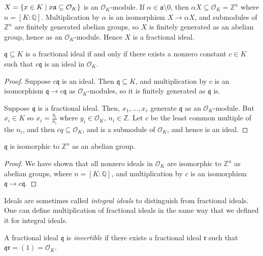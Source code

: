 \( X = \qty{x \in K \mid x\mathfrak a \subseteq \mathcal O_K} \) is an \( \mathcal O_K \)-module.
If \( \alpha \in \mathfrak a \setminus \qty{0} \), then \( \alpha X \subseteq \mathcal O_K = \mathbb Z^n \) where \( n = [K:\mathbb Q] \).
Multiplication by \( \alpha \) is an isomorphism \( X \to \alpha X \), and submodules of \( \mathbb Z^n \) are finitely generated abelian groups, so \( X \) is finitely generated as an abelian group, hence as an \( \mathcal O_K \)-module.
Hence \( X \) is a fractional ideal.
\begin{lemma}
    \( \mathfrak q \subseteq K \) is a fractional ideal if and only if there exists a nonzero constant \( c \in K \) such that \( c\mathfrak q \) is an ideal in \( \mathcal O_K \).
\end{lemma}
\begin{proof}
    Suppose \( c\mathfrak q \) is an ideal.
    Then \( \mathfrak q \subseteq K \), and multiplication by \( c \) is an isomorphism \( \mathfrak q \to c\mathfrak q \) as \( \mathcal O_K \)-modules, so it is finitely generated as \( \mathfrak q \) is.

    Suppose \( \mathfrak q \) is a fractional ideal.
    Then, \( x_1, \dots, x_r \) generate \( \mathfrak q \) as an \( \mathcal O_K \)-module.
    But \( x_i \in K \) so \( x_i = \frac{y_i}{n_i} \) where \( y_i \in \mathcal O_K \), \( n_i \in \mathbb Z \).
    Let \( c \) be the least common multiple of the \( n_i \), and then \( cq \subseteq \mathcal O_K \), and is a submodule of \( \mathcal O_K \), and hence is an ideal.
\end{proof}
\begin{corollary}
    \( \mathfrak q \) is isomorphic to \( \mathbb Z^n \) as an abelian group.
\end{corollary}
\begin{proof}
    We have shown that all nonzero ideals in \( \mathcal O_K \) are isomorphic to \( \mathbb Z^n \) as abelian groups, where \( n = [K:\mathbb Q] \), and multiplication by \( c \) is an isomorphism \( \mathfrak q \to c\mathfrak q \).
\end{proof}
Ideals are sometimes called \emph{integral ideals} to distinguish from fractional ideals.
One can define multiplication of fractional ideals in the same way that we defined it for integral ideals.
\begin{definition}
    A fractional ideal \( \mathfrak q \) is \emph{invertible} if there exists a fractional ideal \( \mathfrak r \) such that \( \mathfrak q\mathfrak r = (1) = \mathcal O_K \).
\end{definition}
